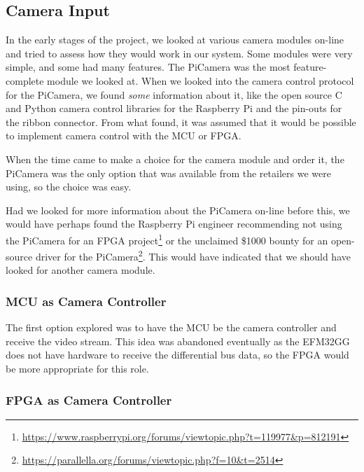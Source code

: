 \subsection{Camera Input}
\label{sec:camera_discussion}
In the early stages of the project,
we looked at various camera modules on-line and tried to assess how they would work in our system.
Some modules were very simple, and some had many features.
The PiCamera was the most feature-complete module we looked at.
When we looked into the camera control protocol for the PiCamera,
we found \textit{some} information about it,
like the open source C and Python camera control libraries for the Raspberry Pi
and the pin-outs for the ribbon connector.
From what found, it was assumed that it would be possible to implement camera control with the MCU or FPGA.

When the time came to make a choice for the camera module and order it,
the PiCamera was the only option that was available from the retailers we were using,
so the choice was easy.

Had we looked for more information about the PiCamera on-line before this,
we would have perhaps found the Raspberry Pi engineer recommending not using the PiCamera for an FPGA project\footnote{\url{https://www.raspberrypi.org/forums/viewtopic.php?t=119977&p=812191}} or the unclaimed \$1000 bounty for an open-source driver for the PiCamera\footnote{\url{https://parallella.org/forums/viewtopic.php?f=10&t=2514}}.
This would have indicated that we should have looked for another camera module.

\subsubsection{MCU as Camera Controller}

The first option explored was to have the MCU be the camera controller and receive the video stream.
This idea was abandoned eventually as the EFM32GG does not have hardware to receive the differential bus data,
so the FPGA would be more appropriate for this role.

\subsubsection{FPGA as Camera Controller}


